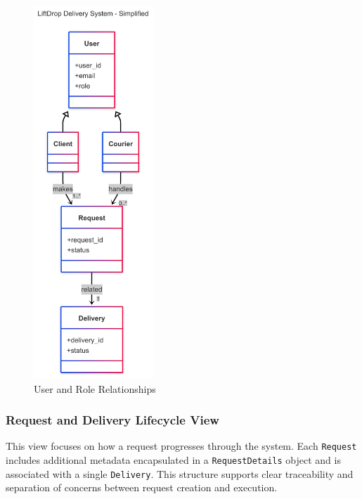 \begin{figure}[H]
    \centering
    \includegraphics[width=0.40\textwidth]{images/UserClientCourierDiagram.png}
    \caption{User and Role Relationships}
\end{figure}

\subsubsection{Request and Delivery Lifecycle View}

This view focuses on how a request progresses through the system. Each \texttt{Request} includes additional metadata encapsulated in a \texttt{RequestDetails} object and is associated with a single \texttt{Delivery}. This structure supports clear traceability and separation of concerns between request creation and execution.

